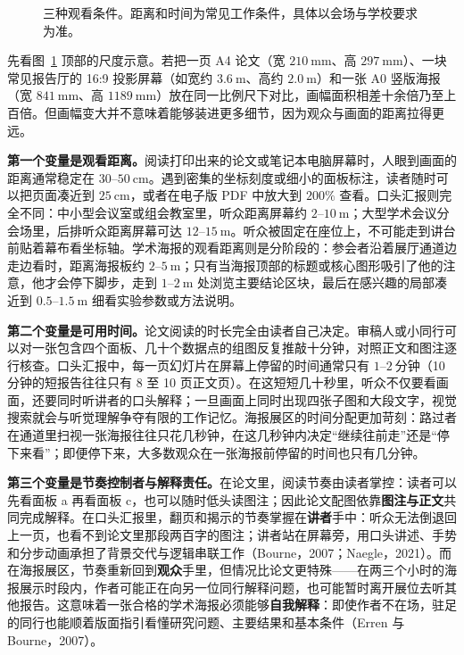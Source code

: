 \begin{figure}[htbp]\centering
\resizebox{\linewidth}{!}{}
\caption{三种观看条件。距离和时间为常见工作条件，具体以会场与学校要求为准。}\label{fig:ch12-01}
\end{figure}

先看图~\ref{fig:ch12-01} 顶部的尺度示意。若把一页 A4 论文（宽 $210\ \text{mm}$、高 $297\ \text{mm}$）、一块常见报告厅的 16:9 投影屏幕（如宽约 $3.6\ \text{m}$、高约 $2.0\ \text{m}$）和一张 A0 竖版海报（宽 $841\ \text{mm}$、高 $1189\ \text{mm}$）放在同一比例尺下对比，画幅面积相差十余倍乃至上百倍。但画幅变大并不意味着能够装进更多细节，因为观众与画面的距离拉得更远。

\textbf{第一个变量是观看距离。}阅读打印出来的论文或笔记本电脑屏幕时，人眼到画面的距离通常稳定在 $30\text{--}50\ \text{cm}$。遇到密集的坐标刻度或细小的面板标注，读者随时可以把页面凑近到 $25\ \text{cm}$，或者在电子版 PDF 中放大到 $200\%$ 查看。口头汇报则完全不同：中小型会议室或组会教室里，听众距离屏幕约 $2\text{--}10\ \text{m}$；大型学术会议分会场里，后排听众距离屏幕可达 $12\text{--}15\ \text{m}$。听众被固定在座位上，不可能走到讲台前贴着幕布看坐标轴。学术海报的观看距离则是分阶段的：参会者沿着展厅通道边走边看时，距离海报板约 $2\text{--}5\ \text{m}$；只有当海报顶部的标题或核心图形吸引了他的注意，他才会停下脚步，走到 $1\text{--}2\ \text{m}$ 处浏览主要结论区块，最后在感兴趣的局部凑近到 $0.5\text{--}1.5\ \text{m}$ 细看实验参数或方法说明。

\textbf{第二个变量是可用时间。}论文阅读的时长完全由读者自己决定。审稿人或小同行可以对一张包含四个面板、几十个数据点的组图反复推敲十分钟，对照正文和图注逐行核查。口头汇报中，每一页幻灯片在屏幕上停留的时间通常只有 $1\text{--}2\ \text{分钟}$（10 分钟的短报告往往只有 8 至 10 页正文页）。在这短短几十秒里，听众不仅要看画面，还要同时听讲者的口头解释；一旦画面上同时出现四张子图和大段文字，视觉搜索就会与听觉理解争夺有限的工作记忆。海报展区的时间分配更加苛刻：路过者在通道里扫视一张海报往往只花几秒钟，在这几秒钟内决定“继续往前走”还是“停下来看”；即便停下来，大多数观众在一张海报前停留的时间也只有几分钟。

\textbf{第三个变量是节奏控制者与解释责任。}在论文里，阅读节奏由读者掌控：读者可以先看面板 a 再看面板 c，也可以随时低头读图注；因此论文配图依靠\textbf{图注与正文}共同完成解释。在口头汇报里，翻页和揭示的节奏掌握在\textbf{讲者}手中：听众无法倒退回上一页，也看不到论文里那段两百字的图注；讲者站在屏幕旁，用口头讲述、手势和分步动画承担了背景交代与逻辑串联工作（Bourne，2007；Naegle，2021）。而在海报展区，节奏重新回到\textbf{观众}手里，但情况比论文更特殊——在两三个小时的海报展示时段内，作者可能正在向另一位同行解释问题，也可能暂时离开展位去听其他报告。这意味着一张合格的学术海报必须能够\textbf{自我解释}：即使作者不在场，驻足的同行也能顺着版面指引看懂研究问题、主要结果和基本条件（Erren 与 Bourne，2007）。

